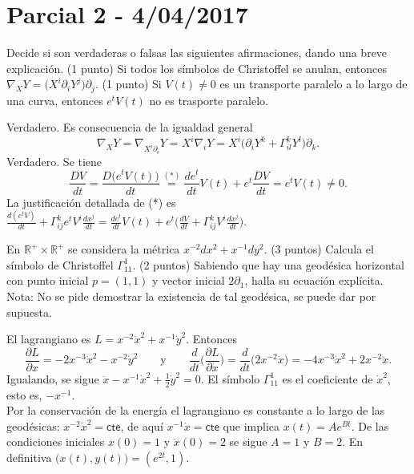 \section{Parcial 2 - 4/04/2017}
\begin{problem}[1]Decide si son verdaderas o falsas las siguientes afirmaciones, dando una breve explicación.
	\ppart (1 punto) Si todos los símbolos de Christoffel se anulan, entonces $\nabla_X Y= \big(X^i\partial_i Y^j\big) \partial_j$. 
	\ppart (1 punto) Si $V(t)\ne 0$ es un transporte paralelo a lo largo de una curva, entonces $e^tV(t)$ no es trasporte paralelo.
	
	\solution 
	\spart Verdadero. Es consecuencia de la igualdad general
	\[
	\nabla_XY
	=
	\nabla_{X^i\partial_i}Y
	=
	X^i\nabla_{i}Y
	=
	X^i\big(\partial_iY^k+\Gamma_{il}^kY^l\big)\partial_k.
	\]
	\spart Verdadero. Se tiene
	\[
	\frac{DV}{dt}
	=
	\frac{D\big(e^tV(t)\big)}{dt}
	\overset{(*)}{=}
	\frac{de^t}{dt}V(t)+e^t\frac{DV}{dt}
	=
	e^tV(t)\ne 0.
	\]
	La justificación detallada de (*) es 
	$\frac{d(e^tV)}{dt}+\Gamma_{ij}^ke^tV^i\frac{d x^j}{dt}
	= \frac{de^t}{dt}V(t)+e^t
	\Big(
	\frac{dV}{dt}+\Gamma_{ij}^kV^i\frac{d x^j}{dt}\big)$.
\end{problem}
\newpage
\begin{problem}[2]En $\mathbb{R}^+\times \mathbb{R}^+$ se considera la métrica $x^{-2}dx^2+x^{-1}dy^2$. 
	\ppart (3 puntos) Calcula el símbolo de Christoffel $\Gamma_{11}^1$.
	\ppart (2 puntos) Sabiendo que hay una geodésica horizontal con punto inicial $p=(1,1)$ y vector inicial $2\partial_1$, halla su ecuación explícita.  {\sf Nota:} No se pide demostrar la existencia de tal geodésica, se puede dar por supuesta. 
	
	\solution 
	\spart El lagrangiano es $L=x^{-2}\dot{x}^2+x^{-1}\dot{y}^2$. Entonces
	\[
	\frac{\partial L}{\partial x}
	=
	-2x^{-3}\dot{x}^2-x^{-2}\dot{y}^2
	\qquad\text{y}\qquad
	\frac{d}{dt}
	\Big(
	\frac{\partial L}{\partial \dot{x}}
	\Big)
	=
	\frac{d}{dt}
	\big(
	2x^{-2}\dot{x}
	\big)
	=
	-4x^{-3}\dot{x}^2+2x^{-2}\ddot{x}.
	\]
	Igualando, se sigue $\ddot{x}-x^{-1}\dot{x}^2+\frac 12 \dot{y}^2=0$. El símbolo $\Gamma_{11}^1$ es el coeficiente de $\dot{x}^2$, esto es, $-x^{-1}$.\\
	\spart Por la conservación de la energía el lagrangiano es constante a lo largo de las geodésicas: $x^{-2}\dot{x}^2=\textsf{cte}$, de aquí $x^{-1}\dot{x}=\textsf{cte}$ que implica $x(t)=Ae^{Bt}$. De las condiciones iniciales $x(0)=1$ y $\dot{x}(0)=2$ se sigue $A=1$ y $B=2$. En definitiva $\big(x(t),y(t)\big)=(e^{2t},1)$.  
\end{problem}
